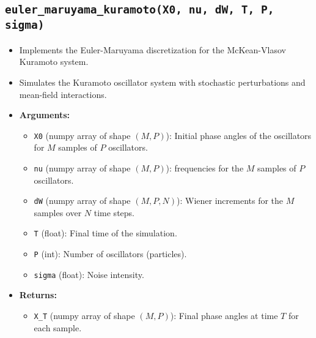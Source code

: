 \documentclass{article}
\begin{document}
\subsection{\texttt{euler\_maruyama\_kuramoto(X0, nu, dW, T, P, sigma)}}
\begin{itemize}
    \item Implements the Euler-Maruyama discretization for the McKean-Vlasov Kuramoto system.
    \item Simulates the Kuramoto oscillator system with stochastic perturbations and mean-field interactions.
    \item \textbf{Arguments:}
    \begin{itemize}
        \item \texttt{X0} (numpy array of shape $(M, P)$): Initial phase angles of the oscillators for $M$ samples of $P$ oscillators.
        \item \texttt{nu} (numpy array of shape $(M, P)$):  frequencies for the $M$ samples of $P$ oscillators.
        \item \texttt{dW} (numpy array of shape $(M, P, N)$): Wiener increments for the $M$ samples over $N$ time steps.
        \item \texttt{T} (float): Final time of the simulation.
        \item \texttt{P} (int): Number of oscillators (particles).
        \item \texttt{sigma} (float): Noise intensity.
    \end{itemize}
    \item \textbf{Returns:}
    \begin{itemize}
        \item \texttt{X\_T} (numpy array of shape $(M, P)$): Final phase angles at time $T$ for each sample.
    \end{itemize}
\end{itemize}
\end{document}
